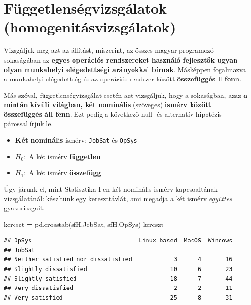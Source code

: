 \documentclass[
]{book}
\newenvironment{Shaded}{\begin{snugshade}}{\end{snugshade}}
\newcommand{\NormalTok}[1]{#1}
\newcommand{\OperatorTok}[1]{\textcolor[rgb]{0.81,0.36,0.00}{\textbf{#1}}}
\providecommand{\tightlist}{%
  \setlength{\itemsep}{0pt}\setlength{\parskip}{0pt}}
\begin{document}
\section{Függetlenségvizsgálatok (homogenitásvizsgálatok)}\label{fuxfcggetlensuxe9gvizsguxe1latok-homogenituxe1svizsguxe1latok}

Vizsgáljuk meg azt az állítást, miszerint, az összes magyar programozó sokaságában az \textbf{egyes operációs rendszereket használó fejlesztők ugyan olyan munkahelyi elégedettségi arányokkal bírnak}. Másképpen fogalmazva a munkahelyi elégedettség és az operációs rendszer között \textbf{összefüggés ll fenn}.

Más szóval, függetlenségvizsgálat esetén azt vizsgáljuk, hogy a sokaságban, azaz \textbf{a mintán kívüli világban, két nominális} (szöveges) \textbf{ismérv között összefüggés áll fenn}. Ezt pedig a következő null- és alternatív hipotézis párossal írjuk le.

\begin{itemize}
\tightlist
\item
  \textbf{Két nominális} ismérv: \texttt{JobSat} és \texttt{OpSys}
\item
  \(H_0:\) A két ismérv \textbf{független}
\item
  \(H_1:\) A két ismérv \textbf{összefügg}
\end{itemize}

Úgy járunk el, mint Statisztika I-en két nominális ismérv kapcsoaltának vizsgálatánál: készítünk egy kereszttávlát, ami megadja a két ismérv \emph{együttes} gyakoriságait.

\begin{Shaded}
\begin{Highlighting}[]
\NormalTok{kereszt }\OperatorTok{=}\NormalTok{ pd.crosstab(sfH.JobSat, sfH.OpSys)}
\NormalTok{kereszt}
\end{Highlighting}
\end{Shaded}

\begin{verbatim}
## OpSys                               Linux-based  MacOS  Windows
## JobSat                                                         
## Neither satisfied nor dissatisfied            3      4       16
## Slightly dissatisfied                        10      6       23
## Slightly satisfied                           18      7       44
## Very dissatisfied                             2      2       11
## Very satisfied                               25      8       31
\end{verbatim}
\end{document}
